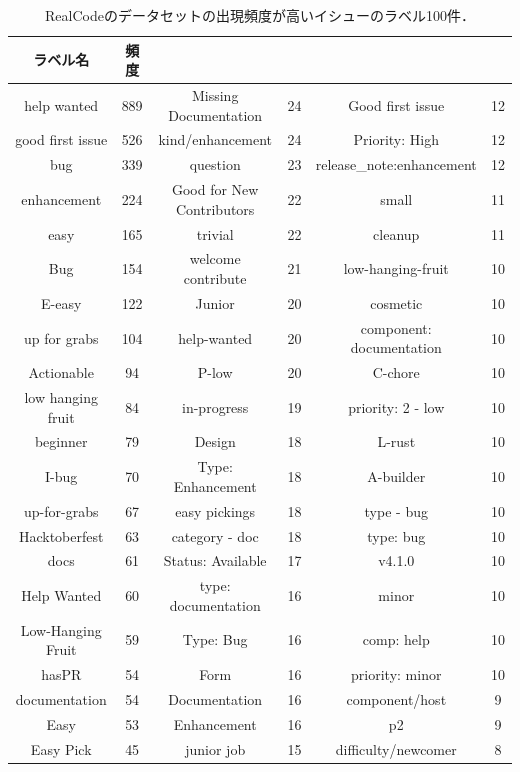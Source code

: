 \begin{table}[!b]
    \small
    \centering
    \caption{RealCodeのデータセットの出現頻度が高いイシューのラベル100件．}
    \label{table:issue_label_freq}
    \begin{tabular}{ c | c || c | c || c | c } \Xhline{3\arrayrulewidth}
        ラベル名 & 頻度 &  &  &  &  \\ \hline \hline
        help wanted & 889 & Missing Documentation & 24 & Good first issue & 12 \\
        good first issue & 526 & kind/enhancement & 24 & Priority: High & 12 \\
        bug & 339 & question & 23 & release\_note:enhancement & 12 \\
        enhancement & 224 & Good for New Contributors & 22 & small & 11 \\
        easy & 165 & trivial & 22 & cleanup & 11 \\
        Bug & 154 & welcome contribute & 21 & low-hanging-fruit & 10 \\
        E-easy & 122 & Junior & 20 & cosmetic & 10 \\
        up for grabs & 104 & help-wanted & 20 & component: documentation & 10 \\
        Actionable & 94 & P-low & 20 & C-chore & 10 \\
        low hanging fruit & 84 & in-progress & 19 & priority: 2 - low & 10 \\
        beginner & 79 & Design & 18 & L-rust & 10 \\
        I-bug & 70 & Type: Enhancement & 18 & A-builder & 10 \\
        up-for-grabs & 67 & easy pickings & 18 & type - bug & 10 \\
        Hacktoberfest & 63 & category - doc & 18 & type: bug & 10 \\
        docs & 61 & Status: Available & 17 & v4.1.0 & 10 \\
        Help Wanted & 60 & type: documentation & 16 & minor & 10 \\
        Low-Hanging Fruit & 59 & Type: Bug & 16 & comp: help & 10 \\
        hasPR & 54 & Form & 16 & priority: minor & 10 \\
        documentation & 54 & Documentation & 16 & component/host & 9 \\
        Easy & 53 & Enhancement & 16 & p2 & 9 \\
        Easy Pick & 45 & junior job & 15 & difficulty/newcomer & 8 \\

\end{tabular}
\end{table}
